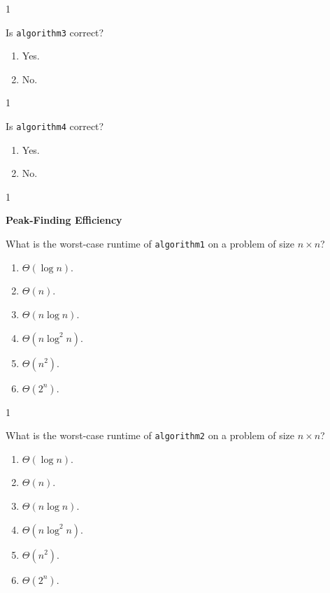 \documentclass[12pt,twoside]{article}
\begin{document}
\begin{problems}
\begin{problemparts}
\ifsolution \solution{}
1
\fi

\problempart {} Is \texttt{algorithm3} correct?
\begin{enumerate}
\item Yes.
\item No.
\end{enumerate}

\ifsolution \solution{}
1
\fi

\problempart {} Is \texttt{algorithm4} correct?
\begin{enumerate}
\item Yes.
\item No.
\end{enumerate}

\ifsolution \solution{}
1
\fi

\end{problemparts}

\problem {} \textbf{Peak-Finding Efficiency}

\begin{problemparts}

\problempart {} What is the worst-case runtime of \texttt{algorithm1} on a problem of size $n \times n$?
\begin{enumerate}
\item $\Theta(\log n)$.
\item $\Theta(n)$.
\item $\Theta(n \log n)$.
\item $\Theta(n \log^2 n)$.
\item $\Theta(n^2)$.
\item $\Theta(2^n)$.
\end{enumerate}

\ifsolution \solution{}
1
\fi

\problempart {} What is the worst-case runtime of \texttt{algorithm2} on a problem of size $n \times n$?
\begin{enumerate}
\item $\Theta(\log n)$.
\item $\Theta(n)$.
\item $\Theta(n \log n)$.
\item $\Theta(n \log^2 n)$.
\item $\Theta(n^2)$.
\item $\Theta(2^n)$.
\end{enumerate}


\end{problemparts}
\end{problems}
\end{document}
